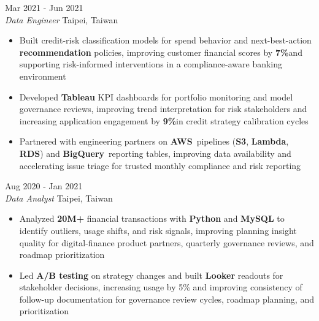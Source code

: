 \documentclass[11pt,letterpaper]{article}
\begin{document}
\vspace{0.375cm}
 \hfill Mar 2021 - Jun 2021\\[-1pt]
\textit{Data Engineer} \hfill Taipei, Taiwan
\begin{itemize}[leftmargin=1.45em, rightmargin=0pt, itemsep=-2pt, topsep=-1pt, parsep=0pt]
  \item \justifying Built credit-risk classification models for spend behavior and next-best-action \textbf{recommendation} policies, improving customer financial scores by \textbf{7\%}\hspace{0.25em}and supporting risk-informed interventions in a compliance-aware banking environment
  \item \justifying Developed \textbf{Tableau} KPI dashboards for portfolio monitoring and model governance reviews, improving trend interpretation for risk stakeholders and increasing application engagement by \textbf{9\%}\hspace{0.25em}in credit strategy calibration cycles
  \item \justifying Partnered with engineering partners on \textbf{AWS}\ pipelines (\textbf{S3}, \textbf{Lambda}, \textbf{RDS}) and \textbf{BigQuery}\ reporting tables, improving data availability and accelerating issue triage for trusted monthly compliance and risk reporting
\end{itemize}

\vspace{0.375cm}
 \hfill Aug 2020 - Jan 2021\\[-1pt]
\textit{Data Analyst} \hfill Taipei, Taiwan
\begin{itemize}[leftmargin=1.45em, rightmargin=0pt, itemsep=-2pt, topsep=-1pt, parsep=0pt]
  \item \justifying Analyzed \textbf{20M+} financial transactions with \textbf{Python} and \textbf{MySQL} to identify outliers, usage shifts, and risk signals, improving planning insight quality for digital-finance product partners, quarterly governance reviews, and roadmap prioritization
  \item \justifying Led \textbf{A/B testing} on strategy changes and built \textbf{Looker} readouts for stakeholder decisions, increasing usage by 5\% and improving consistency of follow-up documentation for governance review cycles, roadmap planning, and prioritization
\end{itemize}

\vspace{0.35\baselineskip}
\end{document}
